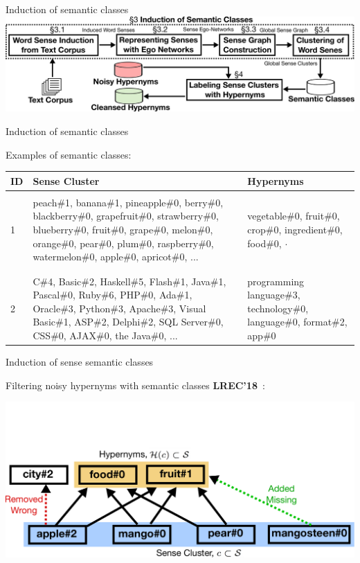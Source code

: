 \begin{frame}{Induction of  semantic classes}
	\includegraphics[width=1.0\textwidth]{semantic-classes-outline}
\end{frame}


\begin{frame}{Induction of  semantic classes}

Examples of semantic classes:


\begin{table}[ht]
\centering
\scriptsize
\begin{tabular}{l|p{6cm}|p{3.5cm}} 

\bf ID &  \bf Sense Cluster & \bf Hypernyms \\ \hline
& &  \\
1 & peach\#1, banana\#1, pineapple\#0, berry\#0, blackberry\#0, grapefruit\#0, strawberry\#0, blueberry\#0, fruit\#0, grape\#0, melon\#0, orange\#0, pear\#0, plum\#0, raspberry\#0, watermelon\#0, apple\#0, apricot\#0, ...  &  vegetable\#0, fruit\#0, crop\#0, ingredient\#0, food\#0, $\cdot$ \\ & &  \\ \hline
& &  \\
2  & C\#4, Basic\#2, Haskell\#5, Flash\#1, Java\#1, Pascal\#0, Ruby\#6, PHP\#0, Ada\#1, Oracle\#3, Python\#3, Apache\#3, Visual Basic\#1, ASP\#2, Delphi\#2, SQL Server\#0, CSS\#0, AJAX\#0, the Java\#0, ... & programming language\#3, technology\#0, language\#0, format\#2, app\#0 
\end{tabular}
\end{table}

	
\end{frame}



\begin{frame}{Induction of sense semantic classes}

Filtering noisy hypernyms with semantic classes \textbf{LREC'18}~\cite{panchenko:2018:SemanticClasses}: 

	\centering \includegraphics[width=1.0\textwidth]{coset}
	
\end{frame}



